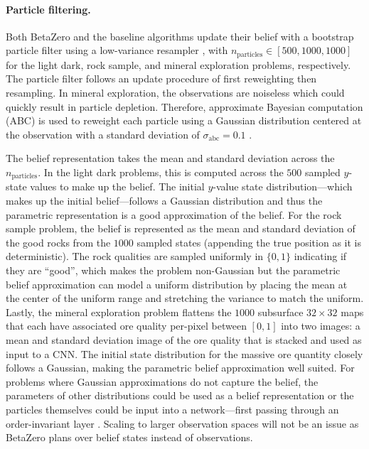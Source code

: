 \paragraph{Particle filtering.}
Both BetaZero and the baseline algorithms update their belief with a bootstrap particle filter using a low-variance resampler \cite{gordon1993novel}, with $n_\text{particles} \in [500,1000,1000]$ for the light dark, rock sample, and mineral exploration problems, respectively.
The particle filter follows an update procedure of first reweighting then resampling.
In mineral exploration, the observations are noiseless which could quickly result in particle depletion.
Therefore, approximate Bayesian computation (ABC) is used to reweight each particle using a Gaussian distribution centered at the observation with a standard deviation of $\sigma_\text{abc} = 0.1$ \cite{csillery2010approximate}.

The belief representation takes the mean and standard deviation across the $n_\text{particles}$. In the light dark problems, this is computed across the $500$ sampled $y$-state values to make up the belief.
The initial $y$-value state distribution---which makes up the initial belief---follows a Gaussian distribution and thus the parametric representation is a good approximation of the belief.
For the rock sample problem, the belief is represented as the mean and standard deviation of the good rocks from the $1000$ sampled states (appending the true position as it is deterministic).
The rock qualities are sampled uniformly in $\{0,1\}$ indicating if they are ``good'', which makes the problem non-Gaussian but the parametric belief approximation can model a uniform distribution by placing the mean at the center of the uniform range and stretching the variance to match the uniform.
Lastly, the mineral exploration problem flattens the $1000$ subsurface $32\times32$ maps that each have associated ore quality per-pixel between $[0,1]$ into two images: a mean and standard deviation image of the ore quality that is stacked and used as input to a CNN.
The initial state distribution for the massive ore quantity closely follows a Gaussian, making the parametric belief approximation well suited.
For problems where Gaussian approximations do not capture the belief, the parameters of other distributions could be used as a belief representation or the particles themselves could be input into a network---first passing through an order-invariant layer \cite{igl2018deep}.
Scaling to larger observation spaces will not be an issue as BetaZero plans over belief states instead of observations.



